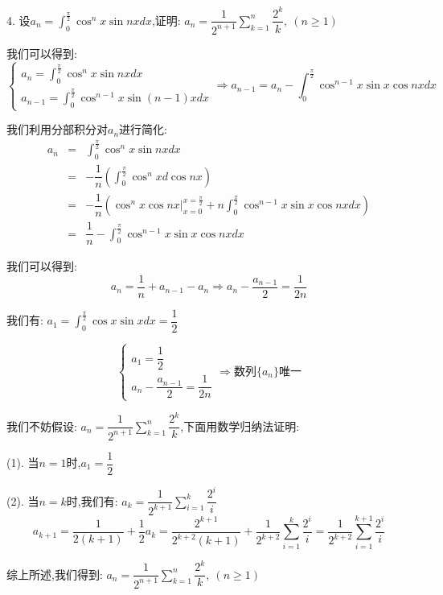 4. 设$a_{n}=\int_{0}^{\frac{\pi}{2}}\cos^n x\sin nxdx$,证明:  $a_{n}=\dfrac{1}{2^{n+1}}\sum\limits_{k=1}^{n}\dfrac{2^k}{k},\ (n\geq 1)$
\begin{solution}

	我们可以得到:
	$$\left\lbrace
	\begin{array}{l}
		a_{n}=\int_{0}^{\frac{\pi}{2}}\cos^n x\sin nxdx\\
		a_{n-1}=\int_{0}^{\frac{\pi}{2}}\cos^{n-1} x\sin(n-1)xdx
	\end{array}
	\right. \Rightarrow a_{n-1}=a_{n}-\int_{0}^{\frac{\pi}{2}}\cos^{n-1}x\sin x\cos nxdx$$
	
	我们利用分部积分对$a_{n}$进行简化:  
	\begin{eqnarray*}
		a_{n}&=&\int_{0}^{\frac{\pi}{2}}\cos^n x\sin nxdx\\
		&=&-\dfrac{1}{n}\left(\int_{0}^{\frac{\pi}{2}}\cos^n xd\cos nx \right)\\
		&=&-\dfrac{1}{n}\left(\cos^n x\cos nx|_{x=0}^{x=\frac{\pi}{2}}+n\int_{0}^{\frac{\pi}{2}}\cos^{n-1}x\sin x\cos nxdx\right)\\
		&=&\dfrac{1}{n}-\int_{0}^{\frac{\pi}{2}}\cos^{n-1}x\sin x\cos nxdx
	\end{eqnarray*}

	我们可以得到:  $$a_{n}=\dfrac{1}{n}+a_{n-1}-a_{n}\Rightarrow a_{n}-\dfrac{a_{n-1}}{2}=\dfrac{1}{2n}$$
	
	我们有:  $a_{1}=\int_{0}^{\frac{\pi}{2}}\cos x\sin xdx=\dfrac{1}{2}$
	
	$$\left\lbrace
	\begin{array}{l}
		a_{1}=\dfrac{1}{2}\\
		a_{n}-\dfrac{a_{n-1}}{2}=\dfrac{1}{2n}
	\end{array}
	\right. \Rightarrow\text{数列}\{a_{n}\}\text{唯一}$$
	
	我们不妨假设:  $a_{n}=\dfrac{1}{2^{n+1}}\sum\limits_{k=1}^{n}\dfrac{2^k}{k}$,下面用数学归纳法证明:  
	
	(1). 当$n=1$时,$a_{1}=\dfrac{1}{2}$
	
	(2). 当$n=k$时,我们有:  $a_{k}=\dfrac{1}{2^{k+1}}\sum\limits_{i=1}^{k}\dfrac{2^i}{i}$
	$$a_{k+1}=\dfrac{1}{2(k+1)}+\dfrac{1}{2}a_{k}=\dfrac{2^{k+1}}{2^{k+2}(k+1)}+\dfrac{1}{2^{k+2}}\sum\limits_{i=1}^{k}\dfrac{2^i}{i}=\dfrac{1}{2^{k+2}}\sum\limits_{i=1}^{k+1}\dfrac{2^i}{i}$$
	
	综上所述,我们得到:  $a_{n}=\dfrac{1}{2^{n+1}}\sum\limits_{k=1}^{n}\dfrac{2^k}{k},\ (n\geq 1)$
\end{solution}

